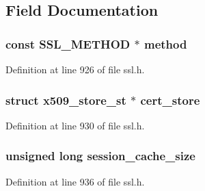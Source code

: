 \subsection{Field Documentation}
\subsubsection[{\texorpdfstring{method}{method}}]{\setlength{\rightskip}{0pt plus 5cm}const {\bf S\+S\+L\+\_\+\+M\+E\+T\+H\+OD} $\ast$ method}\hypertarget{structssl__ctx__st_a6ad8f26b97b806807adf5b0dcebd3c2a}{}\label{structssl__ctx__st_a6ad8f26b97b806807adf5b0dcebd3c2a}


Definition at line 926 of file ssl.\+h.

\subsubsection[{\texorpdfstring{cert\+\_\+store}{cert_store}}]{\setlength{\rightskip}{0pt plus 5cm}struct {\bf x509\+\_\+store\+\_\+st} $\ast$ cert\+\_\+store}\hypertarget{structssl__ctx__st_a8d14ba878fb2bbb67465414ad2718a64}{}\label{structssl__ctx__st_a8d14ba878fb2bbb67465414ad2718a64}


Definition at line 930 of file ssl.\+h.

\subsubsection[{\texorpdfstring{session\+\_\+cache\+\_\+size}{session_cache_size}}]{\setlength{\rightskip}{0pt plus 5cm}unsigned long session\+\_\+cache\+\_\+size}\hypertarget{structssl__ctx__st_a46d7ea9278a2e68216a1597cd0c07f27}{}\label{structssl__ctx__st_a46d7ea9278a2e68216a1597cd0c07f27}


Definition at line 936 of file ssl.\+h.

